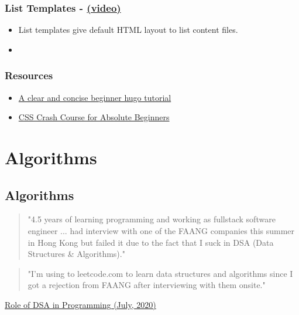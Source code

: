 \subsection{List Templates - \href{https://youtu.be/8b2YTSMdMps}{(video)}}
\begin{itemize}
	\item
	List templates give default HTML layout to list content files.
	\item

\end{itemize}

\subsection*{Resources}
\begin{itemize}
	\item
	\href{https://www.linkedin.com/learning/learning-static-site-building-with-hugo-2/build-a-static-site-with-hugo?resume=false}{A clear and concise beginner hugo tutorial}
	\item
	\href{https://youtu.be/yfoY53QXEnI}{CSS Crash Course for Absolute Beginners}
\end{itemize}





\chapter{Algorithms}

\section{Algorithms}


\begin{quote}
	"4.5 years of learning programming and working as fullstack software engineer ... had interview with one of the FAANG companies this summer in Hong Kong but failed it due to the fact that I suck in DSA (Data Structures \& Algorithms)."
\end{quote}

\begin{quote}
	"I'm using to leetcode.com to learn data structures
	and algorithms since I got a rejection from FAANG after interviewing with them onsite."
\end{quote}

\href{https://blog.codechef.com/2020/07/24/the-role-of-data-structure-and-algorithms-in-programming/}{Role of DSA in Programming (July, 2020)}


